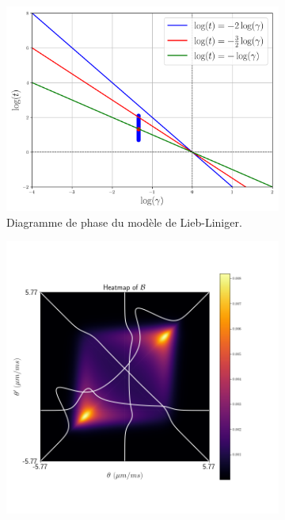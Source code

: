 \begin{figure}[H]
	\centering
	\begin{subfigure}[b]{0.45\textwidth}
		\includegraphics[width=\textwidth]{Figures/04_GGE_Fluctuation/diagram.png}
		\caption{Diagramme de phase du modèle de Lieb-Liniger.}
		\label{fig:diag}
	\end{subfigure}
	\hfill
	\begin{subfigure}[b]{0.45\textwidth}
		\includegraphics[width=\textwidth]{Figures/04_GGE_Fluctuation/fluctu.png}

\end{subfigure}
\end{figure}

